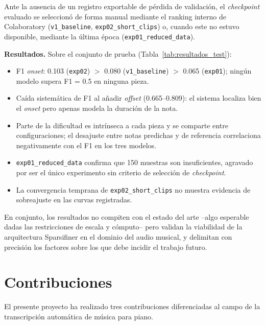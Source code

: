 Ante la ausencia de un registro exportable de pérdida de validación,
el \textit{checkpoint} evaluado se seleccionó de forma manual mediante
el ranking interno de Colaboratory \newline(\texttt{v1\_baseline},
\texttt{exp02\_short\_clips}) o, cuando este no estuvo disponible,
mediante la última época (\texttt{exp01\_reduced\_data}).
\clearpage

\textbf{Resultados.} Sobre el conjunto de prueba
(Tabla~\ref{tab:resultados_test}):

\begin{itemize}
    \item F1 \textit{onset}: 0.103 (\texttt{exp02}) $>$ 0.080
    (\texttt{v1\_baseline}) $>$ 0.065 (\texttt{exp01}); ningún modelo
    supera F1 = 0.5 en ninguna pieza.
    \item Caída sistemática de F1 al añadir \textit{offset}
    (0.665--0.809): el sistema localiza bien el \textit{onset} pero
    apenas modela la duración de la nota.
    \item Parte de la dificultad es intrínseca a cada pieza y se
    comparte entre configuraciones; el desajuste entre notas
    predichas y de referencia correlaciona negativamente con el F1 en
    los tres modelos.
    \item \texttt{exp01\_reduced\_data} confirma que 150 muestras son
    insuficientes, agravado por ser el único experimento sin criterio
    de selección de \textit{checkpoint}.
    \item La convergencia temprana de \texttt{exp02\_short\_clips} no
    muestra evidencia de sobreajuste en las curvas registradas.
\end{itemize}

En conjunto, los resultados no compiten con el estado del arte --algo
esperable dadas las restricciones de escala y cómputo-- pero validan
la viabilidad de la arquitectura Sparsifiner en el dominio del audio
musical, y delimitan con precisión los factores sobre los que debe
incidir el trabajo futuro.
\clearpage
\section{Contribuciones}
\label{sec:contribuciones}

El presente proyecto ha realizado tres contribuciones diferenciadas al
campo de la transcripción automática de música para piano.

